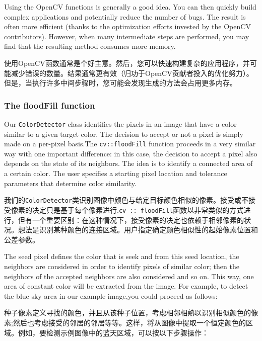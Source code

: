 \documentclass[]{article}
\begin{document}
Using the OpenCV functions is generally a good idea. You can then
quickly build complex applications and potentially reduce the number of
bugs. The result is often more efficient (thanks to the optimization
efforts invested by the OpenCV contributors). However, when many
intermediate steps are performed, you may find that the resulting method
consumes more memory.

使用OpenCV函数通常是个好主意。然后，您可以快速构建复杂的应用程序，并可能减少错误的数量。结果通常更有效（归功于OpenCV贡献者投入的优化努力）。但是，当执行许多中间步骤时，您可能会发现生成的方法会占用更多内存。

\hypertarget{header-n1241}{%
\subsubsection{The floodFill function}\label{header-n1241}}

Our \texttt{ColorDetector} class identifies the pixels in an image that
have a color similar to a given target color. The decision to accept or
not a pixel is simply made on a per-pixel basis.The
\texttt{cv::floodFill} function proceeds in a very similar way with one
important difference: in this case, the decision to accept a pixel also
depends on the state of its neighbors. The idea is to identify a
connected area of a certain color. The user specifies a starting pixel
location and tolerance parameters that determine color similarity.

我们的\texttt{ColorDetector}类识别图像中颜色与给定目标颜色相似的像素。接受或不接受像素的决定只是基于每个像素进行.\texttt{cv\ ::\ floodFill}函数以非常类似的方式进行，但有一个重要区别：在这种情况下，接受像素的决定也依赖于相邻像素的状况。想法是识别某种颜色的连接区域。用户指定确定颜色相似性的起始像素位置和公差参数。

The seed pixel defines the color that is seek and from this seed
location, the neighbors are considered in order to identify pixels of
similar color; then the neighbors of the accepted neighbors are also
considered and so on. This way, one area of constant color will be
extracted from the image. For example, to detect the blue sky area in
our example image,you could proceed as follows:

种子像素定义寻找的颜色，并且从该种子位置，考虑相邻相熟以识别相似颜色的像素;然后也考虑接受的邻居的邻居等等。这样，将从图像中提取一个恒定颜色的区域。例如，要检测示例图像中的蓝天区域，可以按以下步骤操作：
\end{document}
